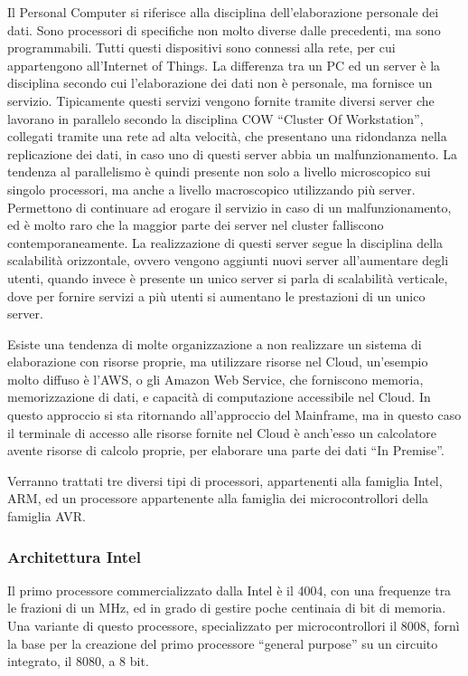 \documentclass{article}
\numberwithin{equation}{subsection}
\begin{document}
Il Personal Computer si riferisce alla disciplina dell'elaborazione personale dei dati. Sono processori di specifiche non molto diverse dalle precedenti, ma sono 
programmabili. Tutti questi dispositivi sono connessi alla rete, per cui appartengono all'Internet of Things. La differenza tra un PC ed un server è la disciplina secondo cui 
l'elaborazione dei dati non è personale, ma fornisce un servizio. Tipicamente questi servizi vengono fornite tramite diversi server che lavorano in parallelo secondo la 
disciplina COW ``Cluster Of Workstation'', collegati 
tramite una rete ad alta velocità, che presentano una ridondanza nella replicazione dei dati, in caso uno di questi server abbia un malfunzionamento. La tendenza al parallelismo 
è quindi presente non solo a livello microscopico sui singolo processori, ma anche a livello macroscopico utilizzando più server. Permettono di continuare ad erogare il servizio in 
caso di un malfunzionamento, ed è molto raro che la maggior parte dei server nel cluster falliscono contemporaneamente. La realizzazione di questi server segue la disciplina 
della scalabilità orizzontale, ovvero vengono aggiunti nuovi server all'aumentare degli utenti, quando invece è presente un unico server si parla di scalabilità verticale, dove 
per fornire servizi a più utenti si aumentano le prestazioni di un unico server. 


Esiste una tendenza di molte organizzazione a non realizzare un sistema di elaborazione con risorse proprie, ma utilizzare risorse nel Cloud, un'esempio molto diffuso è l'AWS, 
o gli Amazon Web Service, che forniscono memoria, memorizzazione di dati, e capacità di computazione accessibile nel Cloud. In questo approccio si sta ritornando all'approccio 
del Mainframe, ma in questo caso il terminale di accesso alle risorse fornite nel Cloud è anch'esso un calcolatore avente risorse di calcolo proprie, per elaborare una 
parte dei dati ``In Premise''. 



Verranno trattati tre diversi tipi di processori, appartenenti alla famiglia Intel, ARM, ed un processore appartenente alla famiglia dei microcontrollori della famiglia AVR.

\subsubsection{Architettura Intel}

Il primo processore commercializzato dalla Intel è il 4004, con una frequenze tra le frazioni di un MHz, ed in grado di gestire poche centinaia di bit di memoria. Una variante 
di questo processore, specializzato per microcontrollori il 8008, fornì la base per la creazione del primo processore ``general purpose'' su un circuito integrato, il 8080, a 8 bit.  
\end{document}
